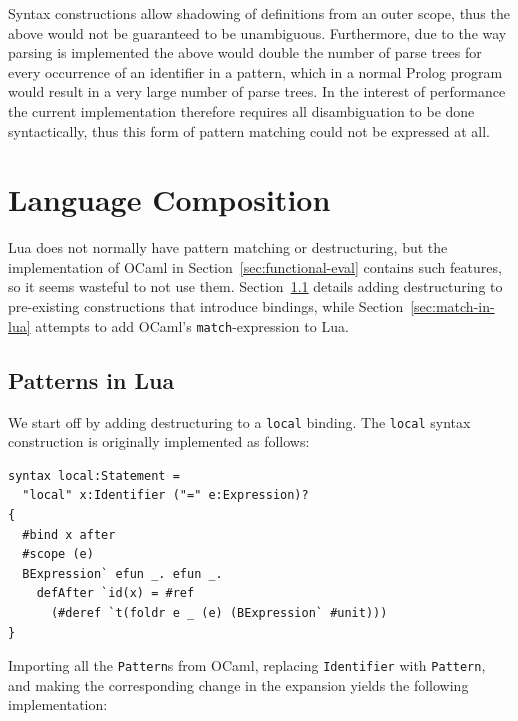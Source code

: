 \documentclass{kththesis}
\begin{document}
Syntax constructions allow shadowing of definitions from an outer scope, thus the above would not be guaranteed to be unambiguous. Furthermore, due to the way parsing is implemented the above would double the number of parse trees for every occurrence of an identifier in a pattern, which in a normal Prolog program would result in a very large number of parse trees. In the interest of performance the current implementation therefore requires all disambiguation to be done syntactically, thus this form of pattern matching could not be expressed at all.



\section{Language Composition} \label{sec:language-composition}

Lua does not normally have pattern matching or destructuring, but the implementation of OCaml in Section~\ref{sec:functional-eval} contains such features, so it seems wasteful to not use them. Section~\ref{sec:patterns-in-lua} details adding destructuring to pre-existing constructions that introduce bindings, while Section~\ref{sec:match-in-lua} attempts to add OCaml's \texttt{match}-expression to Lua.

\subsection{Patterns in Lua} \label{sec:patterns-in-lua}

We start off by adding destructuring to a \texttt{local} binding. The \texttt{local} syntax construction is originally implemented as follows:

\begin{verbatim}
syntax local:Statement =
  "local" x:Identifier ("=" e:Expression)?
{
  #bind x after
  #scope (e)
  BExpression` efun _. efun _.
    defAfter `id(x) = #ref
      (#deref `t(foldr e _ (e) (BExpression` #unit)))
}
\end{verbatim}

Importing all the \texttt{Pattern}s from OCaml, replacing \texttt{Identifier} with \texttt{Pattern}, and making the corresponding change in the expansion yields the following implementation:
\end{document}
